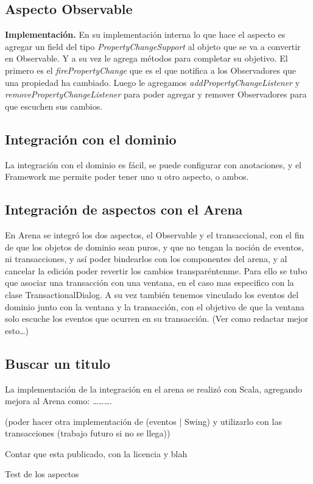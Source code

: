	\subsection{ Aspecto Observable}
			
	{\bf Implementación.}
	En su implementación interna lo que hace el aspecto es agregar un field del
	tipo \emph{PropertyChangeSupport} al objeto que se va a convertir en
	Observable. Y a su vez le agrega métodos para completar su objetivo.
	El primero es el \emph{firePropertyChange} que es el que notifica a los
	Observadores que una propiedad ha cambiado.	Luego le agregamos
	\emph{addPropertyChangeListener} y \emph{removePropertyChangeListener} para
	poder agregar y remover Observadores para que escuchen sus cambios.


\subsection{Integración con el dominio } 
	La integración con el dominio es fácil, se puede configurar con
	anotaciones, y el Framework me permite poder tener uno u otro aspecto, o
	ambos.
	
	
\subsection{Integración de aspectos con el Arena}
En Arena se integró los dos aspectos, el Observable y el transaccional, con el
fin de que los objetos de dominio sean puros, y que no tengan la noción de
eventos, ni transacciones, y así poder bindearlos con los componentes del arena,
y al cancelar la edición poder revertir los cambios transparéntenme.
Para ello se tubo que asociar una transacción con una ventana, en el caso mas
especifico con la clase TransactionalDialog. A su vez también tenemos vinculado
los eventos del dominio junto con la ventana y la transacción, con el objetivo
de que la ventana solo escuche los eventos que ocurren en su transacción.
(Ver como redactar mejor esto\ldots )

	
\subsection{Buscar un  titulo}
La implementación de la integración en el arena se realizó con Scala, agregando
mejora al Arena como: \ldots \ldots \ldots. 
	
	
(poder hacer otra implementación de (eventos | Swing) y utilizarlo con las
transacciones (trabajo futuro si no se llega))

Contar que esta publicado, con la licencia y blah

Test de los aspectos


